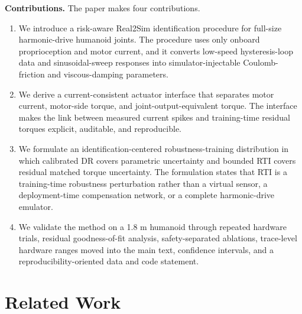 \documentclass[twoside,final,1p,times]{elsarticle}
\newcommand{\rev}[1]{#1}
\begin{document}
\noindent\textbf{Contributions.} \rev{The paper makes four contributions.}
\begin{enumerate}[leftmargin=1.4em]
  \item \rev{We introduce a risk-aware Real2Sim identification procedure for full-size harmonic-drive humanoid joints. The procedure uses only onboard proprioception and motor current, and it converts low-speed hysteresis-loop data and sinusoidal-sweep responses into simulator-injectable Coulomb-friction and viscous-damping parameters.}
  \item \rev{We derive a current-consistent actuator interface that separates motor current, motor-side torque, and joint-output-equivalent torque. The interface makes the link between measured current spikes and training-time residual torques explicit, auditable, and reproducible.}
  \item \rev{We formulate an identification-centered robustness-training distribution in which calibrated DR covers parametric uncertainty and bounded RTI covers residual matched torque uncertainty. The formulation states that RTI is a training-time robustness perturbation rather than a virtual sensor, a deployment-time compensation network, or a complete harmonic-drive emulator.}
  \item \rev{We validate the method on a 1.8 m humanoid through repeated hardware trials, residual goodness-of-fit analysis, safety-separated ablations, trace-level hardware ranges moved into the main text, confidence intervals, and a reproducibility-oriented data and code statement.}
\end{enumerate}


\section{Related Work}
\label{sec:related_work}
\end{document}
